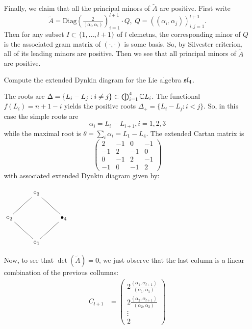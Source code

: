\begin{itemize}
Finally, we claim that all the principal minors of $\widetilde{A}$ are positive. First write 
\begin{equation}
    \widetilde{A}=\text{Diag}(\tfrac{2}{(\alpha_i,\alpha_i)})_{i=1}^{l+1}\cdot Q,\;Q= ((\alpha_i,\alpha_j))_{i,j=1}^{l+1}.
\end{equation}
Then for any subset $I\subset \{1,\dots,l+1\}$ of $l$ elemetns, the corresponding minor of $Q$ is the 
associated gram matrix of $(\cdot,\cdot)$ is some basis. So, by Silvester criterion, all of its leading minors are positive. Then we 
see that all principal minors of $\widetilde{A}$ are positive.




\begin{dang}
    \begin{example}
        Compute the extended Dynkin diagram for the Lie algebra $\mathfrak{sl}_4$.
    \end{example}
\end{dang}
The roots are $\Delta=\{L_i-L_j:i\neq j\}\subset \bigoplus_{i=1}^4\mathbb{C} L_i$. The functional $f(L_i)=n+1-i$ yields the 
positive roots $\Delta_+=\{L_i-L_j: i< j\}$. So, in this case the simple roots are 
\begin{equation}
    \alpha_i=L_i-L_{i+1}, i=1,2,3
\end{equation}
while the maximal root is $\theta =\sum_i\alpha_i=L_1-L_4$. The extended Cartan matrix is 
\begin{equation}
    \begin{pmatrix}
        2&-1&0&-1\\
        -1&2&-1&0\\
        0&-1&2&-1\\
        -1&0&-1&2
    \end{pmatrix}
\end{equation}
with associated extended Dynkin diagram given by:
\begin{center}
    $
    \xymatrix{
        &\circ_3 \ar@{-}[rd] \ar@{-}[ld] &\\
        \circ_2 \ar@{-}[rd]&&\bullet_4 \ar@{-}[ld]\\
        &\circ_1&
    }$
\end{center}
Now, to see that $\det(\widetilde{A})=0$, we just observe that the last column is a linear combination of the previous collumns:
\begin{equation}
    \begin{split}
        C_{l+1} &= \begin{pmatrix}
        2\tfrac{(\alpha_1,\alpha_{l+1})}{(\alpha_1,\alpha_1)}\\2\tfrac{(\alpha_2,\alpha_{l+1})}{(\alpha_2,\alpha_2)}\\\vdots\\2

\end{pmatrix}
\end{split}
\end{equation}
\end{itemize}
